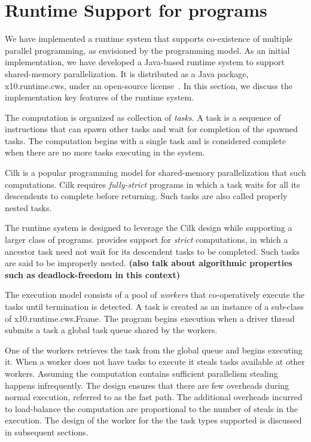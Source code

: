 \section{Runtime Support for \Xten{} programs}
\label{s:runtime}

We have implemented a runtime system that supports co-existence of
multiple parallel programming, as envisioned by the \Xten{} programming
model. As an initial implementation, we have developed a Java-based
runtime system to support shared-memory parallelization. It is
distributed as a Java package, {\java x10.runtime.cws}, under an
open-source license~\cite{x10-webpage}. In this section, we discuss the
implementation key features of the runtime system.

The computation is organized as collection of {\em tasks}. A task is a
sequence of instructions that can spawn other tasks and wait for
completion of the spawned tasks. The computation begins with a single
task and is considered complete when there are no more tasks executing
in the system. 

Cilk is a popular programming model for shared-memory parallelization
that such computations. Cilk requires {\em fully-strict} programs
in which a task waits for all its descendents to complete before
returning. Such tasks are also called properly nested tasks. 

The \Xten{} runtime system is designed to leverage the Cilk design while
supporting a larger class of programs. \Xten{} provides support for {\em
strict} computations, in which a ancestor task need not wait for its
descendent tasks to be completed. Such tasks are said to be improperly
nested. {\bf (also talk about algorithmic properties such as
deadlock-freedom in this context)}

The execution model consists of a pool of {\em workers} that
co-operatively execute the tasks until termination is detected. A task
is created as an instance of a sub-class of {\java x10.runtime.cws.Frame}. The program begins execution when a driver
thread submits a task a global task queue shared by the workers. 

One of the workers retrieves the task from the global queue and begins
executing it. When a worker does not have tasks to execute it steals
tasks available at other workers. Assuming the computation contains
sufficient parallelism stealing happens infrequently. The design
ensures that there are few overheads during normal execution, referred
to as the fast path. The additional overheads incurred to load-balance
the computation are proportional to the number of steals in the
execution. The design of the worker for the the task types supported
is discussed in subsequent sections.

